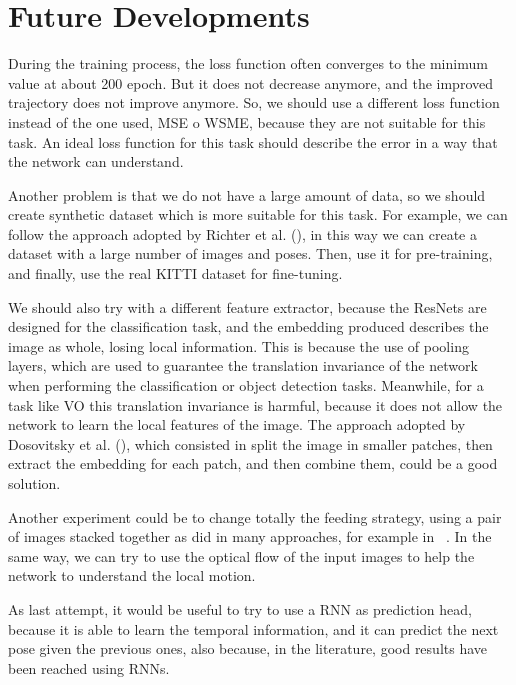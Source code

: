 \section{Future Developments}\label{sec:future-developments}

During the training process, the loss function often converges to the minimum value at about 200 epoch.
But it does not decrease anymore, and the improved trajectory does not improve anymore.
So, we should use a different loss function instead of the one used, MSE o WSME, because they are not suitable for this task.
An ideal loss function for this task should describe the error in a way that the network can understand.

Another problem is that we do not have a large amount of data, so we should create synthetic dataset which is more suitable for this task.
For example, we can follow the approach adopted by Richter et al. (\cite{synthetic_dataset}), in this way we can create a dataset with a large number of images and poses.
Then, use it for pre-training, and finally, use the real KITTI dataset for fine-tuning.

We should also try with a different feature extractor, because the ResNets are designed for the classification task, and the embedding produced describes the image as whole, losing local information.
This is because the use of pooling layers, which are used to guarantee the translation invariance of the network when performing the classification or object detection tasks.
Meanwhile, for a task like VO this translation invariance is harmful, because it does not allow the network to learn the local features of the image.
The approach adopted by Dosovitsky et al. (\cite{vit_paper}), which consisted in split the image in smaller patches, then extract the embedding for each patch, and then combine them, could be a good solution.

Another experiment could be to change totally the feeding strategy, using a pair of images stacked together as did in many approaches, for example in ~\cite{deep_vo}.
In the same way, we can try to use the optical flow of the input images to help the network to understand the local motion.

As last attempt, it would be useful to try to use a RNN as prediction head, because it is able to learn the temporal information, and it can predict the next pose given the previous ones, also because, in the literature, good results have been reached using RNNs.